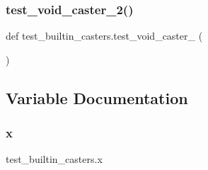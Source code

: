 \subsubsection{\texorpdfstring{test\_void\_caster\_2()}{test\_void\_caster\_2()}}
{\footnotesize\ttfamily def test\+\_\+builtin\+\_\+casters.\+test\+\_\+void\+\_\+caster\+\_ (\begin{DoxyParamCaption}{ }\end{DoxyParamCaption})}



\subsection{Variable Documentation}
\mbox{\label{namespacetest__builtin__casters_a60ceadcddedff98a968a458fec3a1fc1}} 
\subsubsection{\texorpdfstring{x}{x}}
{\footnotesize\ttfamily test\+\_\+builtin\+\_\+casters.\+x}

